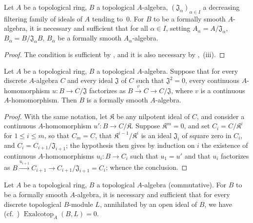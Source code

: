 \begin{corollary}[19.4.2]
\label{0.19.4.2}
Let $A$ be a topological ring, $B$ a topological $A$-algebra, $(\mathfrak{J}_\alpha)_{\alpha\in I}$ a decreasing filtering family of ideals of $A$ tending to~$0$.
For $B$ to be a formally smooth $A$-algebra, it is necessary and sufficient that for all $\alpha\in I$, setting $A_\alpha=A/\mathfrak{J}_\alpha$, $B_\alpha=B/\mathfrak{J}_\alpha B$, $B_\alpha$ be a formally smooth $A_\alpha$-algebra.
\end{corollary}

\begin{proof}
The condition is sufficient by , and it is also necessary by ,~(iii).
\end{proof}

\begin{proposition}[19.4.3]
\label{0.19.4.3}
Let $A$ be a topological ring, $B$ a topological $A$-algebra.
Suppose that for every discrete $A$-algebra $C$ and every ideal $\mathfrak{J}$ of $C$ such that $\mathfrak{J}^2=0$, every continuous $A$-homomorphism $u:B\to C/\mathfrak{J}$ factorizes as $B\xrightarrow{v}C\to C/\mathfrak{J}$, where $v$ is a continuous $A$-homomorphism.
Then $B$ is a formally smooth $A$-algebra.
\end{proposition}

\begin{proof}
With the same notation, let $\mathfrak K$ be any nilpotent ideal of $C$,
and consider a continuous $A$-homomorphism $u':B\to C/\mathfrak K$.
Suppose $\mathfrak K^m=0$, and set $C_i=C/\mathfrak K^i$ for $1\leq i\leq m$, so that $C_m=C$, that $\mathfrak K^{i-1}/\mathfrak K^i$ is an ideal $\mathfrak{J}_i$ of square zero in $C_i$, and $C_i=C_{i+1}/\mathfrak{J}_{i+1}$;
the hypothesis then gives by induction on $i$ the existence of continuous $A$-homomorphisms $u_i:B\to C_i$ such that $u_1=u'$ and that $u_i$ factorizes as $B\xrightarrow{u_{i+1}}C_{i+1}\to C_{i+1}/\mathfrak{J}_{i+1}=C_i$;
whence the conclusion.
\end{proof}

\begin{proposition}[19.4.4]
\label{0.19.4.4}
Let $A$ be a topological ring, $B$ a topological $A$-algebra (commutative).
For $B$ to be a formally smooth $A$-algebra, it is necessary and sufficient that for
every discrete topological $B$-module $L$, annihilated by an open ideal of $B$, we have (cf.~) $\operatorname{Exalcotop}_A(B,L)=0$.
\end{proposition}

